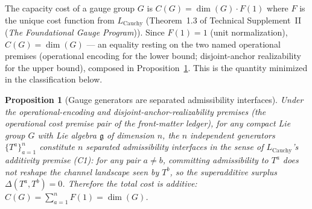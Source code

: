 \documentclass[11pt]{article}
\newtheorem{proposition}[theorem]{Proposition}
\theoremstyle{definition}
\newcommand{\TSII}{Technical Supplement~II (\emph{The Foundational Gauge Program})}
\begin{document}
The capacity cost of a gauge group $G$ is $C(G) = \dim(G) \cdot F(1)$
where $F$ is the unique cost function from $L_{\mathrm{Cauchy}}$
(Theorem~1.3 of \TSII{}).  Since $F(1) = 1$ (unit normalization),
$C(G) = \dim(G)$ --- an equality resting on the two named operational
premises (operational encoding for the lower bound; disjoint-anchor
realizability for the upper bound), composed in
Proposition~\ref{prop:generator_separation}.  This is the quantity
minimized in the classification below.

\begin{proposition}[Gauge generators are separated admissibility interfaces]\label{prop:generator_separation}
Under the operational-encoding and disjoint-anchor-realizability
premises (the operational cost premise pair of the front-matter
ledger), for any compact Lie group $G$ with Lie algebra $\mathfrak{g}$
of dimension $n$, the $n$ independent generators $\{T^a\}_{a=1}^n$
constitute $n$ \emph{separated} admissibility interfaces in the sense
of $L_{\mathrm{Cauchy}}$'s additivity premise (C1): for any pair
$a \ne b$, committing admissibility to $T^a$ does not reshape the
channel landscape seen by $T^b$, so the superadditive surplus
$\Delta(T^a, T^b) = 0$.  Therefore the total cost is additive:
$C(G) = \sum_{a=1}^n F(1) = \dim(G)$.
\end{proposition}
\end{document}

